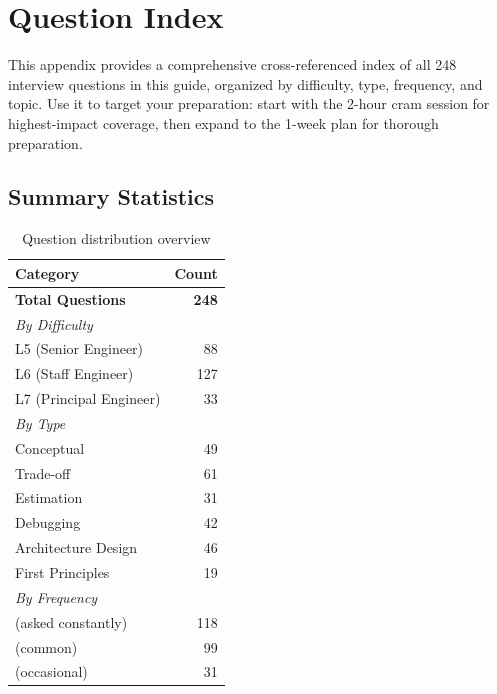 \chapter{Question Index}
\label{chap:question_index}

\begin{tldr}
This appendix provides a comprehensive cross-referenced index of all 248 interview questions in this guide, organized by difficulty, type, frequency, and topic. Use it to target your preparation: start with the 2-hour cram session for highest-impact coverage, then expand to the 1-week plan for thorough preparation.
\end{tldr}

\section{Summary Statistics}
\label{sec:qi_summary}

\begin{table}[H]
\centering
\caption{Question distribution overview}
\begin{tabular}{lr}
\toprule
\textbf{Category} & \textbf{Count} \\
\midrule
\textbf{Total Questions} & \textbf{248} \\
\midrule
\multicolumn{2}{l}{\textit{By Difficulty}} \\
\quad L5 (Senior Engineer) & 88 \\
\quad L6 (Staff Engineer) & 127 \\
\quad L7 (Principal Engineer) & 33 \\
\midrule
\multicolumn{2}{l}{\textit{By Type}} \\
\quad Conceptual & 49 \\
\quad Trade-off & 61 \\
\quad Estimation & 31 \\
\quad Debugging & 42 \\
\quad Architecture Design & 46 \\
\quad First Principles & 19 \\
\midrule
\multicolumn{2}{l}{\textit{By Frequency}} \\
\quad \freqhigh{} (asked constantly) & 118 \\
\quad \freqmed{} (common) & 99 \\
\quad \freqlow{} (occasional) & 31 \\
\bottomrule
\end{tabular}
\end{table}


